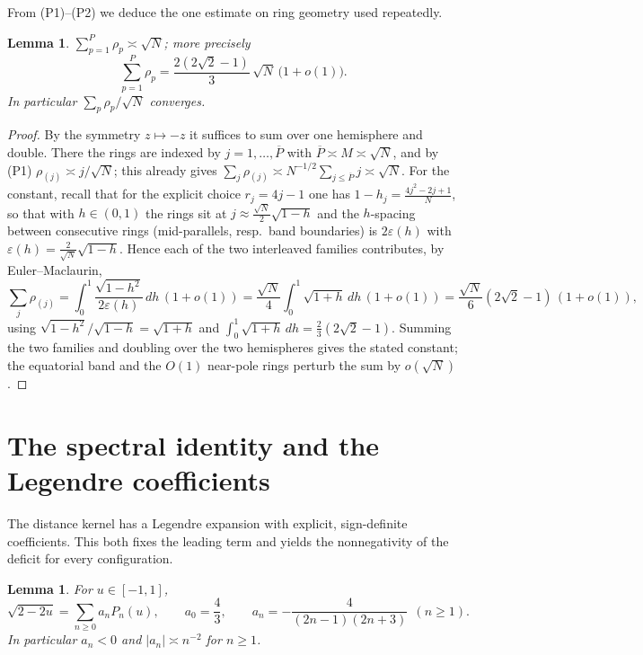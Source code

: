 \documentclass[11pt,reqno]{amsart}
\newtheorem{lemma}[theorem]{Lemma}
\theoremstyle{definition}
\newcommand{\Leg}{P}                      %
\newcommand{\eps}{\varepsilon}
\newcommand{\ol}{\overline}
\newcommand{\abs}[1]{\lvert #1\rvert}
\newcommand{\rp}{\rho}
\begin{document}
From (P1)--(P2) we deduce the one estimate on ring geometry used repeatedly.

\begin{lemma}\label{lem:sumrho}
$\displaystyle\sum_{p=1}^{P}\rp_p\asymp\sqrt N$; more precisely
\[
   \sum_{p=1}^{P}\rp_p=\frac{2(2\sqrt2-1)}{3}\,\sqrt N\,\bigl(1+o(1)\bigr).
\]
In particular $\sum_p\rp_p/\sqrt N$ \emph{converges}.
\end{lemma}

\begin{proof}
By the symmetry $z\mapsto -z$ it suffices to sum over one hemisphere and double. There the rings are
indexed by $j=1,\dots,\ol P$ with $\ol P\asymp M\asymp\sqrt N$, and by (P1) $\rp_{(j)}\asymp j/\sqrt N$;
this already gives $\sum_j\rp_{(j)}\asymp N^{-1/2}\sum_{j\le\ol P}j\asymp\sqrt N$. For the constant,
recall that for the explicit choice $r_j=4j-1$ one has $1-h_j=\frac{4j^2-2j+1}{N}$, so that with
$h\in(0,1)$ the rings sit at $j\approx\tfrac{\sqrt N}{2}\sqrt{1-h}$ and the $h$-spacing between
consecutive rings (mid-parallels, resp.\ band boundaries) is $2\eps(h)$ with
$\eps(h)=\tfrac{2}{\sqrt N}\sqrt{1-h}$. Hence each of the two interleaved families contributes, by
Euler--Maclaurin,
\[
   \sum_{j}\rp_{(j)}=\int_0^1\frac{\sqrt{1-h^2}}{2\eps(h)}\,dh\,(1+o(1))
   =\frac{\sqrt N}{4}\int_0^1\sqrt{1+h}\,dh\,(1+o(1))
   =\frac{\sqrt N}{6}(2\sqrt2-1)\,(1+o(1)),
\]
using $\sqrt{1-h^2}/\sqrt{1-h}=\sqrt{1+h}$ and $\int_0^1\sqrt{1+h}\,dh=\tfrac23(2\sqrt2-1)$. Summing the
two families and doubling over the two hemispheres gives the stated constant; the equatorial band and
the $O(1)$ near-pole rings perturb the sum by $o(\sqrt N)$.
\end{proof}

\section{The spectral identity and the Legendre coefficients}\label{sec:spectral}

The distance kernel has a Legendre expansion with explicit, sign-definite coefficients. This both
fixes the leading term and yields the nonnegativity of the deficit for every configuration.

\begin{lemma}\label{lem:coeffs}
For $u\in[-1,1]$,
\begin{equation}\label{eq:legexp}
   \sqrt{2-2u}=\sum_{n\ge0}a_n\Leg_n(u),\qquad
   a_0=\frac43,\qquad a_n=-\frac{4}{(2n-1)(2n+3)}\ \ (n\ge1).
\end{equation}
In particular $a_n<0$ and $\abs{a_n}\asymp n^{-2}$ for $n\ge1$.
\end{lemma}
\end{document}
